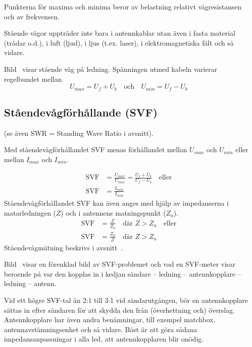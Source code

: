 Punkterna för maxima och minima beror av belastning relativt
vågresistansen och av frekvensen.

Stående vågor uppträder inte bara i antennkablar utan även i fasta material
(trådar o.d.), i luft (ljud), i ljus (t.ex. laser), i elektromagnetiska fält
och så vidare.

Bild~ visar stående våg på ledning.
Spänningen utmed kabeln varierar regelbundet mellan
\[U_{max} = U_f + U_b \quad \text{och} \quad U_{min} = U_f - U_b\]


\subsection{Ståendevågförhållande (SVF)}

(se även SWR = Standing Wave Ratio i avsnitt).

Med ståendevågförhållandet SVF menas förhållandet mellan \(U_{max}\)
och \(U_{min}\) eller mellan \(I_{max}\) och \(I_{min}\).

\begin{align*}
  \text{SVF} &= \frac{U_{max}}{U_{min}} = \frac{U_f + U_b}{U_f - U_b} \quad
  \text{eller} \\
  \text{SVF} &= \frac{I_{max}}{I_{min}}
\end{align*}
Ståendevågförhållandet SVF kan även anges med hjälp av impedanserna i
matarledningen (\(Z\)) och i antennens matningspunkt (\(Z_a\)).
\begin{align*}
  \text{SVF} &= \frac{Z}{Z_a} \quad \text{där } Z > Z_a \quad \text{eller} \\
  \text{SVF} &= \frac{Z_a}{Z} \quad \text{där } Z > Z_a
\end{align*}
Ståendevågmätning beskrivs i avsnitt~.


Bild~ visar en förenklad bild av SVF-problemet och vad en
SVF-meter visar beroende på var den kopplas in i kedjan sändare -- ledning --
antennkopplare -- ledning -- antenn.

Vid ett högre SVF-tal än 2:1 till 3:1 vid sändarutgången, bör en antennkopplare
sättas in efter sändaren för att skydda den från (överhettning och) överslag.
Antennkopplare har även andra benämningar, till exempel matchbox,
antennavstämningsenhet och så vidare.
Bäst är att göra sådana impedansanpassningar i alla led, att antennkopplaren
blir onödig.

